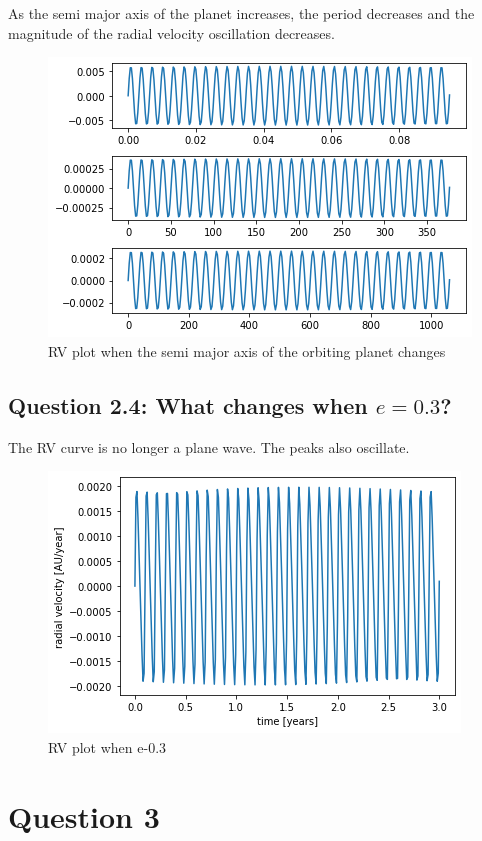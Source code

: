 \documentclass{article}
\begin{document}
\\\\
As the semi major axis of the planet increases, the period decreases and the magnitude of the radial velocity oscillation decreases. 
\begin{figure}[h!]
\begin{center}
    \includegraphics[scale=0.4]{semi_major_axis.png}
    \end{center}
  \caption{RV plot when the semi major axis of the orbiting planet changes}
\end{figure}
\newpage
\subsection{Question 2.4: What changes when $e=0.3$?}
The RV curve is no longer a plane wave. The peaks also oscillate.
\begin{figure}[!h]
    \begin{center}
    \includegraphics[scale=0.5]{e_0.3.png}
    \end{center}
  \caption{RV plot when e-0.3}
\end{figure}
\newpage
\newpage
\section{Question 3}
\end{document}

